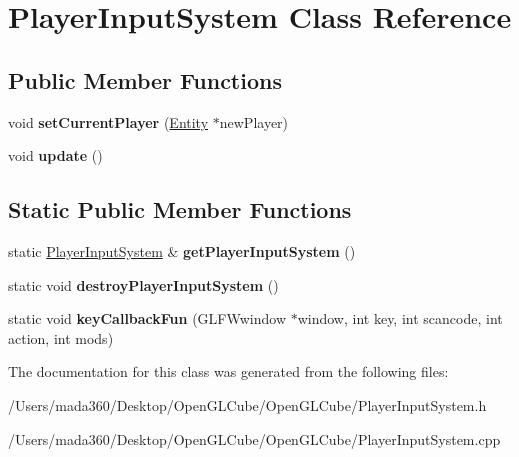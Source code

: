 \hypertarget{class_player_input_system}{}\section{Player\+Input\+System Class Reference}
\label{class_player_input_system}
\subsection*{Public Member Functions}
\begin{DoxyCompactItemize}
\item 
\hypertarget{class_player_input_system_aa3f47a4273ece19097dca4a1e43cd952}{}void {\bfseries set\+Current\+Player} (\hyperlink{class_entity}{Entity} $\ast$new\+Player)\label{class_player_input_system_aa3f47a4273ece19097dca4a1e43cd952}

\item 
\hypertarget{class_player_input_system_afba45156bbafbfd5500650d33ef589ca}{}void {\bfseries update} ()\label{class_player_input_system_afba45156bbafbfd5500650d33ef589ca}

\end{DoxyCompactItemize}
\subsection*{Static Public Member Functions}
\begin{DoxyCompactItemize}
\item 
\hypertarget{class_player_input_system_af1bb16d56fb4435a92bfff2158a1724c}{}static \hyperlink{class_player_input_system}{Player\+Input\+System} \& {\bfseries get\+Player\+Input\+System} ()\label{class_player_input_system_af1bb16d56fb4435a92bfff2158a1724c}

\item 
\hypertarget{class_player_input_system_a4cebc3aabd6d71e05a51d319d83f9fc7}{}static void {\bfseries destroy\+Player\+Input\+System} ()\label{class_player_input_system_a4cebc3aabd6d71e05a51d319d83f9fc7}

\item 
\hypertarget{class_player_input_system_aaf1f183eaecedec4fca9494f54c3d026}{}static void {\bfseries key\+Callback\+Fun} (G\+L\+F\+Wwindow $\ast$window, int key, int scancode, int action, int mods)\label{class_player_input_system_aaf1f183eaecedec4fca9494f54c3d026}

\end{DoxyCompactItemize}


The documentation for this class was generated from the following files\+:\begin{DoxyCompactItemize}
\item 
/\+Users/mada360/\+Desktop/\+Open\+G\+L\+Cube/\+Open\+G\+L\+Cube/Player\+Input\+System.\+h\item 
/\+Users/mada360/\+Desktop/\+Open\+G\+L\+Cube/\+Open\+G\+L\+Cube/Player\+Input\+System.\+cpp\end{DoxyCompactItemize}
